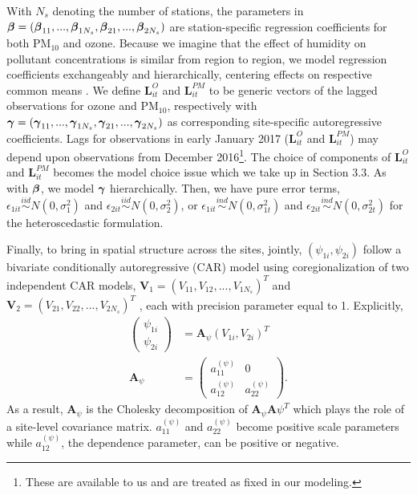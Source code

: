 \documentclass[alpha-refs]{wiley-article}
\newcommand{\bbeta}{ \mbox{\boldmath $ \beta $} }
\newcommand{\bgamma}{ \mbox{\boldmath $\gamma$} }
\newcommand{\bA}{\textbf{A}}
\newcommand{\bL}{\textbf{L}}
\newcommand{\bV}{\textbf{V}}
\begin{document}
With $N_{s}$ denoting the number of stations, the parameters in $\bbeta =( \bbeta_{11},...,\bbeta_{1N_s},\bbeta_{21},...,\bbeta_{2N_s})$ are station-specific regression coefficients for both $\text{PM}_{10}$ and ozone. Because we imagine that the effect of humidity on pollutant concentrations is similar from region to region, we model regression coefficients exchangeably and hierarchically, centering effects on respective common means \citep[see][for introductory thoughts on such hierarchical modeling]{gelman2014}. We define ${\bL^{O}_{it}}$ and ${\bL^{PM}_{it}}$ to be generic vectors of the lagged observations for ozone and $\text{PM}_{10}$, respectively with $\bgamma =( \bgamma_{11},...,\bgamma_{1N_s},\bgamma_{21},...,\bgamma_{2N_s})$ as corresponding site-specific autoregressive coefficients. Lags for observations in early January 2017 (${\bL^{O}_{it}}$ and ${\bL^{PM}_{it}}$) may depend upon observations from December 2016\footnote{These are available to us and are treated as fixed in our modeling.}.  The choice of components of ${\bL^{O}_{it}}$ and ${\bL^{PM}_{it}}$ becomes the model choice issue which we take up in Section 3.3. As with $\bbeta$, we model $\bgamma$ hierarchically. Then, we have pure error terms, $\epsilon_{1it} \overset{iid}{\sim} N(0,\sigma^2_1)$ and $\epsilon_{2it} \overset{iid}{\sim} N(0,\sigma^2_2)$, or $\epsilon_{1it} \overset{ind}{\sim} N(0,\sigma^2_{1t})$ and $\epsilon_{2it} \overset{ind}{\sim} N(0,\sigma^2_{2t})$ for the heteroscedastic formulation.

Finally, to bring in spatial structure across the sites, jointly, $(\psi_{1i},\psi_{2i})$ follow a bivariate conditionally autoregressive (CAR) model using coregionalization of two independent CAR models, $\bV_1 = (V_{11},V_{12},...,V_{1N_s})^T$ and $\bV_2= (V_{21},V_{22},...,V_{2N_s})^T$ \citep[see][]{rue2005,banerjee2014}, each with precision parameter equal to 1.
Explicitly,
\begin{align*}
\begin{pmatrix}
\psi_{1i} \\ \psi_{2i} \end{pmatrix}  &= \bA_\psi (V_{1i} , V_{2i})^T \\
\bA_\psi &= \begin{pmatrix}
a^{(\psi)}_{11} & 0 \\ a^{(\psi)}_{12} & a^{(\psi)}_{22} \end{pmatrix}.
\end{align*}
As a result, $\bA_\psi$ is the Cholesky decomposition of $\bA_\psi \bA\psi^{T}$ which plays the role of a site-level covariance matrix.  $a^{(\psi)}_{11}$ and $a^{(\psi)}_{22}$ become positive scale parameters while  $a^{(\psi)}_{12}$, the dependence parameter, can be positive or negative. 
\end{document}
